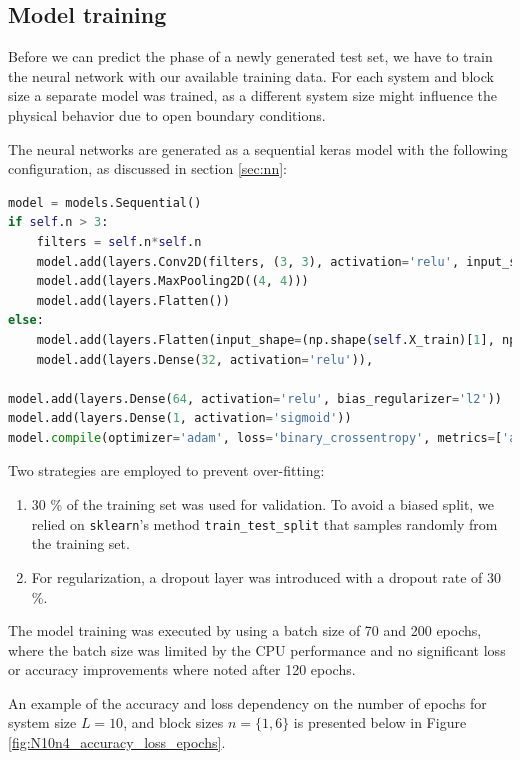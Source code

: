 \documentclass[reprint,amsmath,amssymb,aps,prb]{revtex4-2}
\begin{document}
\newpage
\subsection{Model training}\label{sec:loss_acc}

Before we can predict the phase of a newly generated test set, we have to train the neural network with our available training data. For each system and block size a separate model was trained, as a different system size might influence the physical behavior due to open boundary conditions.

The neural networks are generated as a sequential keras model with the following configuration, as discussed in section \ref{sec:nn}: 
\begin{lstlisting}[language=Python]
model = models.Sequential()
if self.n > 3:
	filters = self.n*self.n
	model.add(layers.Conv2D(filters, (3, 3), activation='relu', input_shape=(np.shape(self.X_train[0])[0], np.shape(self.X_train[0])[1], 2)))
	model.add(layers.MaxPooling2D((4, 4)))
	model.add(layers.Flatten())
else:
	model.add(layers.Flatten(input_shape=(np.shape(self.X_train)[1], np.shape(self.X_train)[1], 2)))
	model.add(layers.Dense(32, activation='relu')),

model.add(layers.Dense(64, activation='relu', bias_regularizer='l2'))
model.add(layers.Dense(1, activation='sigmoid'))
model.compile(optimizer='adam', loss='binary_crossentropy', metrics=['accuracy'])
\end{lstlisting}

Two strategies are employed to prevent over-fitting:
\begin{enumerate}
	\item $30$ \% of the training set was used for validation. To avoid a biased split, we relied on \texttt{sklearn}'s method \texttt{train\_test\_split} that samples randomly from the training set.
	\item For regularization, a dropout layer was introduced with a dropout rate of $30$ \%.
\end{enumerate}

The model training was executed by using a batch size of 70 and 200 epochs, where the batch size was limited by the CPU performance and no significant loss or accuracy improvements where noted after 120 epochs.%

An example of the accuracy and loss dependency on the number of epochs for system size $L=10$, and block sizes $n=\{1, 6\}$ is presented below in Figure \ref{fig:N10n4_accuracy_loss_epochs}.
\end{document}
